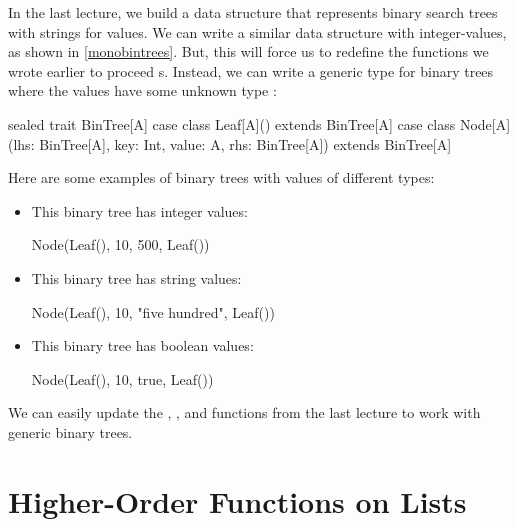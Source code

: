 \documentclass{book}
\begin{document}
In the last lecture, we build a data structure that represents binary
search trees with strings for values. We can write a similar data structure
with integer-values, as shown in \cref{monobintrees}. But, this will force
us to redefine the functions we wrote earlier to proceed s.
Instead, we can write a generic type for binary trees where the values have
some unknown type :

%
\begin{scalacode}
sealed trait BinTree[A]
case class Leaf[A]() extends BinTree[A]
case class Node[A](lhs: BinTree[A], key: Int, value: A, rhs: BinTree[A]) extends BinTree[A]
\end{scalacode}

Here are some examples of binary trees with values of different types:

\begin{itemize}

\item This binary tree has integer values:
\begin{scalacode}
Node(Leaf(), 10, 500, Leaf())
\end{scalacode}

\item This binary tree has string values:
\begin{scalacode}
Node(Leaf(), 10, "five hundred", Leaf())
\end{scalacode}

\item This binary tree has boolean values:
\begin{scalacode}
Node(Leaf(), 10, true, Leaf())
\end{scalacode}

\end{itemize}

We can easily update the , , and 
functions from the last lecture to work with generic binary trees.

\section{Higher-Order Functions on Lists}
\end{document}
